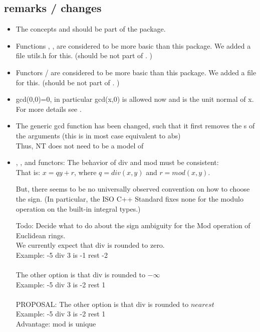 \subsection{remarks / changes }
\begin{itemize}
\item The concepts  and 
      should be part of the  package.  

\item Functions , ,  are considered to be more 
      basic than this package. We added a file utils.h for this. 
      (should be not part of . )

\item Functors / are considered to be more basic than 
      this package. We added a file  for this. 
      (should be not part of . )        
      
\item gcd(0,0)=0, in particular gcd(x,0) is allowed now and is the unit normal of x. 
      For more details see . \\

\item The generic gcd function has been changed, such that it first removes the 
      s of the 
      arguments (this is in most case equivalent to abs)\\
      Thus, NT does not need to be a model of  

\item {}, ,  and functors:
        The behavior of div and mod must be consistent: \\
        That is: $ x = qy + r $, where $q= div(x,y)$ and $r = mod(x,y)$.
        
        But, there seems to be no universally observed convention on how to choose 
        the sign. (In particular, the ISO C++ Standard fixes none for the modulo
        operation on the built-in integral types.)

        Todo: Decide what to do about the sign ambiguity for the Mod operation of
        Euclidean rings.\\
        We currently expect that div is rounded to zero.\\
        Example: -5 div 3 is -1 rest -2 \\
        \\      
        The other option is that div is rounded to $-\infty$\\
        Example: -5 div 3 is -2 rest 1 \\
        \\      
        PROPOSAL:
        The other option is that div is rounded to $nearest $\\
        Example: -5 div 3 is -2 rest 1 \\
        Advantage: mod is unique



\end{itemize}
